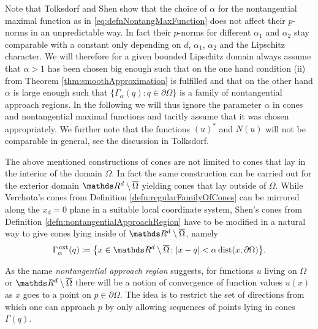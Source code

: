 Note that Tolksdorf \cite{tolksdorf} and Shen \cite{Shen2017} show that the choice of $\alpha$ for the nontangential maximal function as in \ref{eq:defnNontangMaxFunction} does not affect their $p$-norms in an unpredictable way. In fact their $p$-norms for different $\alpha_1$ and $\alpha_2$ stay comparable with a constant only depending on $d$, $\alpha_1$, $\alpha_2$ and the Lipschitz character.
We will therefore for a given bounded Lipschitz domain always assume that $\alpha > 1$ has been chosen big enough such that on the one hand condition (ii) from Theorem \ref{thm:smoothApproximation} is fulfilled and that on the other hand $\alpha$ is large enough such that $\{ \Gamma_\alpha(q) \colon q \in \partial\Omega \}$ is a family of nontangential approach regions.
In the following we will thus ignore the parameter $\alpha$ in cones and nontangential maximal functions and tacitly assume that it was chosen appropriately.
We further note that the functions $(u)^*$ and $N(u)$ will not be comparable in general, see the discussion in Tolksdorf.

The above mentioned constructions of cones are not limited to cones that lay in the interior of the domain $\Omega$.
In fact the same construction can be carried out for the exterior domain $\R^d \setminus \overline{\Omega}$ yielding cones that lay outside of $\Omega$. While Verchota's cones from Definition \ref{defn:regularFamilyOfCones} can be mirrored along the $x_d = 0$ plane in a suitable local coordinate system, Shen's cones from Definition \ref{defn:nontangentialApproachRegion} have to be modified in a natural way to give cones lying inside of $\R^d \setminus \overline \Omega$, namely
\begin{align*}
  \Gamma_\alpha^{\,\mathrm{ext}}(q) \coloneqq \big\{ x \in \R^d \setminus \overline \Omega \colon |x - q| < \alpha \operatorname{dist}(x, \partial\Omega)\big\}.
\end{align*}

As the name \emph{nontangential approach region} suggests, for functions $u$ living on $\Omega$ or $\R^d \setminus \overline\Omega$ there will be a notion of convergence of function values $u(x)$ as $x$ goes to a point on $p \in \partial\Omega$.
The idea is to restrict the set of directions from which one can approach $p$ by only allowing sequences of points lying in cones $\Gamma(q)$.

